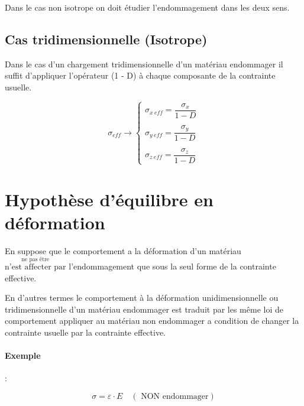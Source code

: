 \documentclass[12pt,a4paper]{report}
\begin{document}
	\begin{tcolorbox}[colback=gray!20, colframe=black, title=Remarque]
		Dans le cas non isotrope on doit \'{e}tudier l'endommagement dans les deux sens.
	\end{tcolorbox}
	
	
	\subsection{Cas tridimensionnelle (Isotrope)}
	
	Dans le cas d'un chargement tridimensionnelle d'un matériau endommager il suffit d'appliquer l'opérateur (1 - D) \`{a} chaque composante de la contrainte usuelle.
	
	\[
	\sigma_{eff} \rightarrow
	\begin{cases}
		\sigma_{x \: eff} = \dfrac{\sigma_{x}}{1 - D} \\ \\
		\sigma_{y \: eff} = \dfrac{\sigma_{y}}{1 - D} \\ \\
		\sigma_{z \: eff} = \dfrac{\sigma_{z}}{1 - D}
	\end{cases}
	\]
	
	
	\section{Hypothèse d'équilibre en déformation}
	
	En suppose que le comportement a la déformation d'un matériau  $\overset{\text{ne pas \^{e}tre}}{\text{n'est affecter par}}$ l'endommagement que sous la seul forme de la contrainte effective.
	
	\vspace{\baselineskip}
	
	En d'autres termes le comportement \`{a} la déformation unidimensionnelle ou tridimensionnelle d'un matériau endommager est traduit par les m\^{e}me loi de comportement appliquer au matériau non endommager a condition de changer la contrainte usuelle par la contrainte effective.
	
	\vspace{\baselineskip}
	
	\paragraph{Exemple }:
	
	\[ \sigma = \varepsilon \cdot E \quad(\text{ NON endommager}) \]
	
\end{document}
